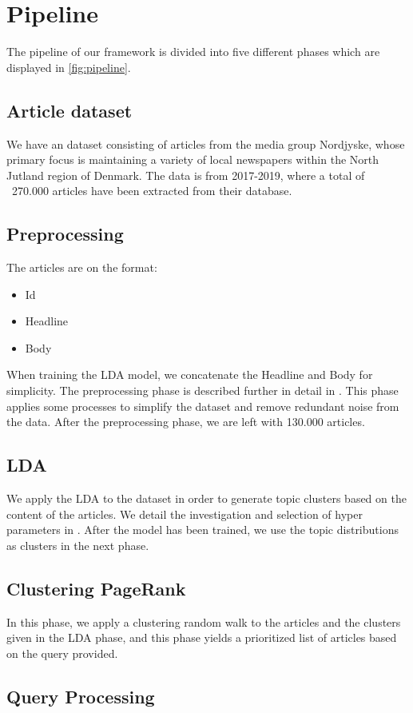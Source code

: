 \section{Pipeline}


The pipeline of our framework is divided into five different phases which are displayed in \autoref{fig:pipeline}.

\subsection{Article dataset}
We have an dataset consisting of articles from the media group Nordjyske, whose primary focus is maintaining a variety of local newspapers within the North Jutland region of Denmark. 
The data is from 2017-2019, where a total of ~270.000 articles have been extracted from their database.

\subsection{Preprocessing}
The articles are on the format:
\begin{itemize}
	\item Id
	\item Headline
	\item Body
\end{itemize}
When training the LDA model, we concatenate the Headline and Body for simplicity.
The preprocessing phase is described further in detail in .
This phase applies some processes to simplify the dataset and remove redundant noise from the data. 
After the preprocessing phase, we are left with 130.000 articles.

\subsection{LDA}
We apply the \acrfull{LDA} to the dataset in order to generate topic clusters based on the content of the articles. 
We detail the investigation and selection of hyper parameters in . 
After the model has been trained, we use the topic distributions as clusters in the next phase.

\subsection{Clustering PageRank}
In this phase, we apply a clustering random walk to the articles and the clusters given in the \gls{LDA} phase, and this phase yields a prioritized list of articles based on the query provided.


\subsection{Query Processing}



